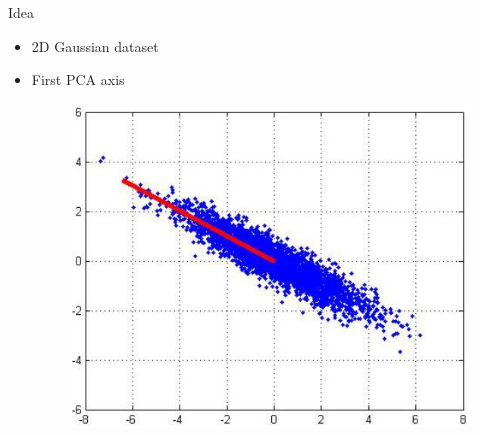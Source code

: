 \documentclass[serif, aspectratio=169]{beamer}
\begin{document}
\begin{frame}{Idea}
    \begin{itemize}
        \item 2D Gaussian dataset
        \item First PCA axis
         \begin{figure}[htpb]
            \begin{center}
                \includegraphics[keepaspectratio, scale=0.6]{pic/pcaData1.JPG}
            \end{center}
        \end{figure}
    \end{itemize}
\end{frame}
\end{document}
